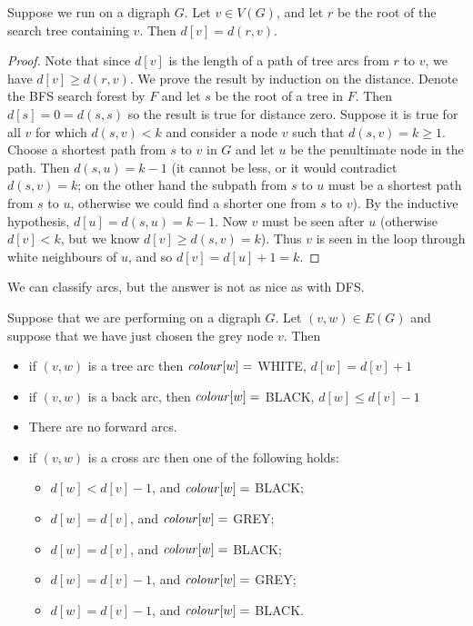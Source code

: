 \begin{Theorem}
\label{thm:BFSdist}
Suppose we run  on a digraph $G$.
Let $v\in V(G)$, and let $r$ be the root of the search tree containing $v$. 
Then $d[v] = d(r, v)$.
\end{Theorem}

\begin{proof}
Note that since $d[v]$ is the length of a path of tree arcs
from $r$ to $v$, we have $d[v] \geq d(r, v)$. We prove the result by
induction on the distance. Denote the BFS search forest by $F$ and let $s$
be the root of a tree in $F$. Then $d[s] = 0 = d(s, s)$ so the result is
true for distance zero. Suppose it is true for all $v$ for which $d(s,
v) < k$ and consider a node $v$ such that $d(s, v) = k \geq 1$. Choose
a shortest path from $s$ to $v$ in $G$ and let $u$ be the penultimate
node in the path. Then $d(s, u) = k - 1$ (it cannot be less, or it would
contradict $d(s, v) = k$; on the other hand the subpath from $s$ to $u$
must be a shortest path from $s$ to $u$, otherwise we could find a shorter
one from $s$ to $v$). By the inductive hypothesis, $d[u] = d(s, u) = k -
1$. Now $v$ must be seen after $u$ (otherwise $d[v] < k$, but we know
$d[v] \geq d(s, v) = k$). Thus $v$ is seen in the loop through white
neighbours of $u$, and so $d[v] = d[u] + 1 = k$. 
\end{proof}

We can classify arcs, but the answer is not as nice as with DFS.

\begin{Theorem}
\label{thm:BFS-arcclass}
Suppose that we are performing  on a digraph $G$. Let $(v,
w)\in E(G)$ and suppose that we have just chosen the grey node $v$. 
Then
\begin{itemize}
\item
if $(v, w)$ is a tree arc then $\operatorname{\text{\textit{colour}}}[w] = $ WHITE, $d[w] = d[v] + 1$
\item
if $(v, w)$ is a back arc, then $\operatorname{\text{\textit{colour}}}[w] = $ BLACK, $d[w] \leq d[v] - 1$  
\item
There are no forward arcs.
\item
if $(v, w)$ is a cross arc then one of the following holds:
\begin{itemize}
\item $d[w] < d[v] - 1$, and $\operatorname{\text{\textit{colour}}}[w] = $ BLACK;
\item $d[w] = d[v]$, and $\operatorname{\text{\textit{colour}}}[w] = $ GREY;
\item $d[w] = d[v]$, and $\operatorname{\text{\textit{colour}}}[w] = $ BLACK;
\item $d[w] = d[v] - 1$, and $\operatorname{\text{\textit{colour}}}[w] = $ GREY;
\item $d[w] = d[v] - 1$, and $\operatorname{\text{\textit{colour}}}[w] = $ BLACK.
\end{itemize}
\end{itemize}
\end{Theorem}

